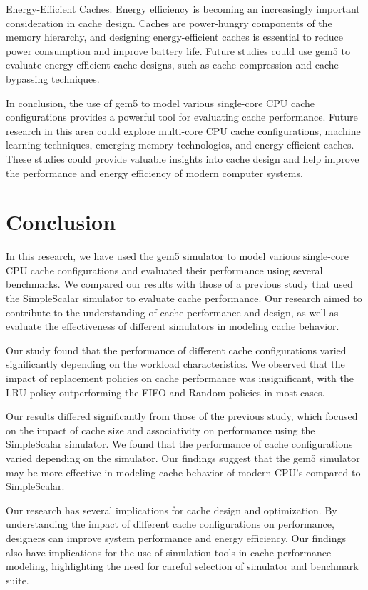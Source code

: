 \documentclass[conference]{IEEEtran}
\begin{document}
Energy-Efficient Caches: Energy efficiency is becoming an increasingly important consideration in cache design. Caches are power-hungry components of the memory hierarchy, and designing energy-efficient caches is essential to reduce power consumption and improve battery life. Future studies could use gem5 to evaluate energy-efficient cache designs, such as cache compression and cache bypassing techniques.

In conclusion, the use of gem5 to model various single-core CPU cache configurations provides a powerful tool for evaluating cache performance. Future research in this area could explore multi-core CPU cache configurations, machine learning techniques, emerging memory technologies, and energy-efficient caches. These studies could provide valuable insights into cache design and help improve the performance and energy efficiency of modern computer systems.

\section{Conclusion}
In this research, we have used the gem5 simulator to model various single-core CPU cache configurations and evaluated their performance using several benchmarks. We compared our results with those of a previous study that used the SimpleScalar simulator to evaluate cache performance. Our research aimed to contribute to the understanding of cache performance and design, as well as evaluate the effectiveness of different simulators in modeling cache behavior.

Our study found that the performance of different cache configurations varied significantly depending on the workload characteristics. We observed that the impact of replacement policies on cache performance was insignificant, with the LRU policy outperforming the FIFO and Random policies in most cases.

Our results differed significantly from those of the previous study, which focused on the impact of cache size and associativity on performance using the SimpleScalar simulator. We found that the performance of cache configurations varied depending on the simulator. Our findings suggest that the gem5 simulator may be more effective in modeling cache behavior of modern CPU's compared to SimpleScalar.

Our research has several implications for cache design and optimization. By understanding the impact of different cache configurations on performance, designers can improve system performance and energy efficiency. Our findings also have implications for the use of simulation tools in cache performance modeling, highlighting the need for careful selection of simulator and benchmark suite.
\end{document}
